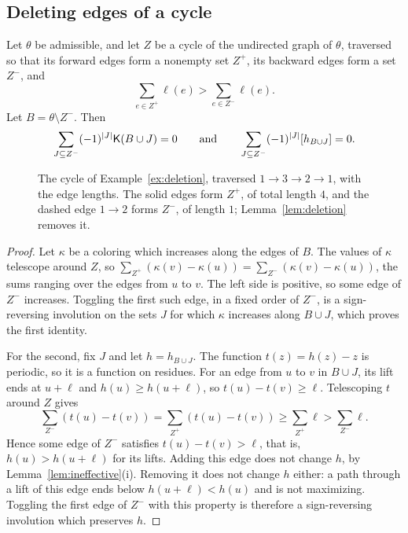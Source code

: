 \subsection{Deleting edges of a cycle}

\begin{lemma}\label{lem:deletion}
Let $\theta$ be admissible, and let $Z$ be a cycle of the undirected graph of
$\theta$, traversed so that its forward edges form a nonempty set $Z^+$, its
backward edges form a set $Z^-$, and
\[
 \sum_{e\in Z^+}\ell(e)>\sum_{e\in Z^-}\ell(e).
\]
Let $B=\theta\setminus Z^-$.
Then
\[
 \sum_{J\subseteq Z^-}(-1)^{|J|}\mathsf{K}(B\cup J)=0
 \qquad\text{and}\qquad
 \sum_{J\subseteq Z^-}(-1)^{|J|}[h_{B\cup J}]=0.
\]
\end{lemma}

\begin{figure}[!ht]
\centering
{}
\caption{The cycle of Example~\ref{ex:deletion}, traversed $1\to3\to2\to1$, with
the edge lengths.
The solid edges form $Z^+$, of total length $4$, and the dashed edge $1\to2$
forms $Z^-$, of length $1$; Lemma~\ref{lem:deletion} removes it.}
\label{fig:deletionCycle}
\end{figure}

\begin{proof}
Let $\kappa$ be a coloring which increases along the edges of $B$.
The values of $\kappa$ telescope around $Z$, so
$\sum_{Z^+}(\kappa(v)-\kappa(u))=\sum_{Z^-}(\kappa(v)-\kappa(u))$, the sums ranging over
the edges from $u$ to $v$.
The left side is positive, so some edge of $Z^-$ increases.
Toggling the first such edge, in a fixed order of $Z^-$, is a sign-reversing
involution on the sets $J$ for which $\kappa$ increases along $B\cup J$, which
proves the first identity.

For the second, fix $J$ and let $h=h_{B\cup J}$.
The function $t(z)=h(z)-z$ is periodic, so it is a function on residues.
For an edge from $u$ to $v$ in $B\cup J$, its lift ends at $u+\ell$ and
$h(u)\geq h(u+\ell)$, so $t(u)-t(v)\geq\ell$.
Telescoping $t$ around $Z$ gives
\[
 \sum_{Z^-}(t(u)-t(v))=\sum_{Z^+}(t(u)-t(v))\geq\sum_{Z^+}\ell>\sum_{Z^-}\ell.
\]
Hence some edge of $Z^-$ satisfies $t(u)-t(v)>\ell$, that is, $h(u)>h(u+\ell)$ for its
lifts.
Adding this edge does not change $h$, by Lemma~\ref{lem:ineffective}(i).
Removing it does not change $h$ either: a path through a lift of this edge ends
below $h(u+\ell)<h(u)$ and is not maximizing.
Toggling the first edge of $Z^-$ with this property is therefore a sign-reversing
involution which preserves $h$.
\end{proof}

